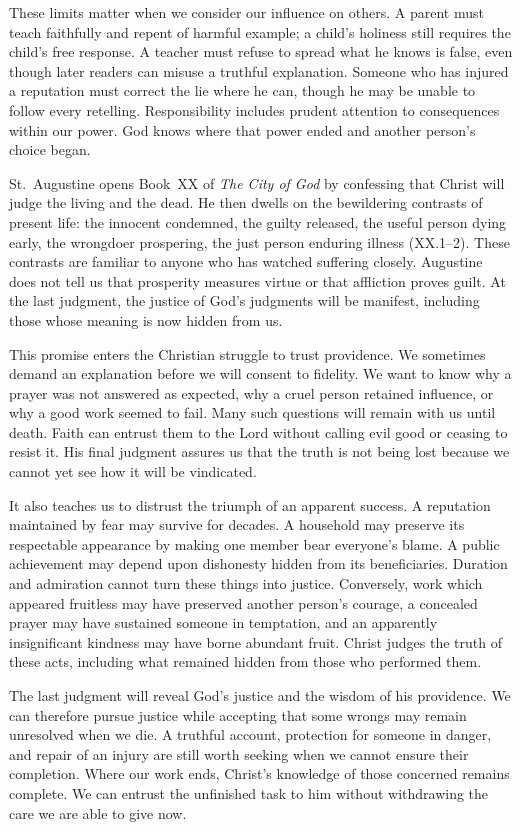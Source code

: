 These limits matter when we consider our influence on others. A parent must teach faithfully and repent of harmful example; a child's holiness still requires the child's free response. A teacher must refuse to spread what he knows is false, even though later readers can misuse a truthful explanation. Someone who has injured a reputation must correct the lie where he can, though he may be unable to follow every retelling. Responsibility includes prudent attention to consequences within our power. God knows where that power ended and another person's choice began.

St.~Augustine opens Book~XX of \emph{The City of God} by confessing that Christ will judge the living and the dead. He then dwells on the bewildering contrasts of present life: the innocent condemned, the guilty released, the useful person dying early, the wrongdoer prospering, the just person enduring illness (XX.1--2). These contrasts are familiar to anyone who has watched suffering closely. Augustine does not tell us that prosperity measures virtue or that affliction proves guilt. At the last judgment, the justice of God's judgments will be manifest, including those whose meaning is now hidden from us.

This promise enters the Christian struggle to trust providence. We sometimes demand an explanation before we will consent to fidelity. We want to know why a prayer was not answered as expected, why a cruel person retained influence, or why a good work seemed to fail. Many such questions will remain with us until death. Faith can entrust them to the Lord without calling evil good or ceasing to resist it. His final judgment assures us that the truth is not being lost because we cannot yet see how it will be vindicated.

It also teaches us to distrust the triumph of an apparent success. A reputation maintained by fear may survive for decades. A household may preserve its respectable appearance by making one member bear everyone's blame. A public achievement may depend upon dishonesty hidden from its beneficiaries. Duration and admiration cannot turn these things into justice. Conversely, work which appeared fruitless may have preserved another person's courage, a concealed prayer may have sustained someone in temptation, and an apparently insignificant kindness may have borne abundant fruit. Christ judges the truth of these acts, including what remained hidden from those who performed them.

The last judgment will reveal God's justice and the wisdom of his providence. We can therefore pursue justice while accepting that some wrongs may remain unresolved when we die. A truthful account, protection for someone in danger, and repair of an injury are still worth seeking when we cannot ensure their completion. Where our work ends, Christ's knowledge of those concerned remains complete. We can entrust the unfinished task to him without withdrawing the care we are able to give now.

